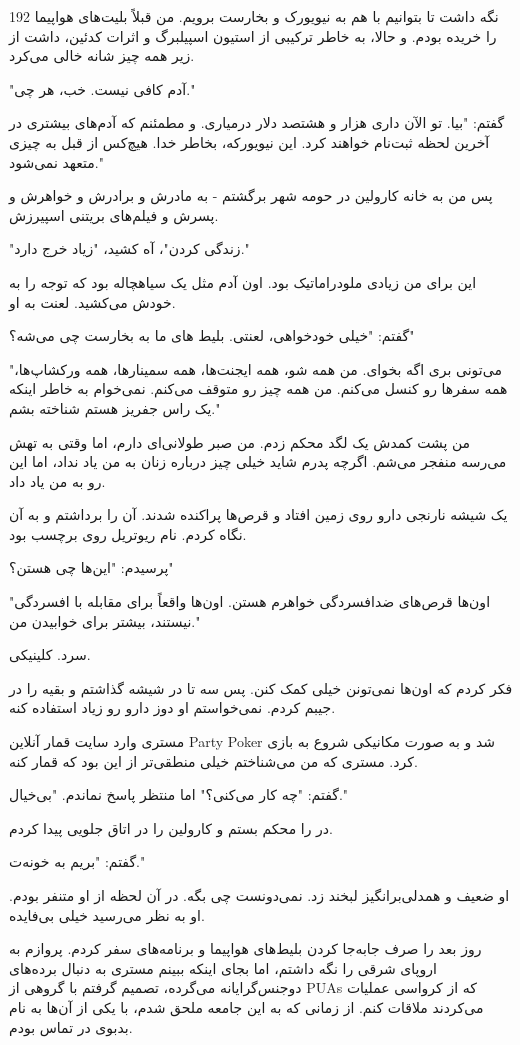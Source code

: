 192
نگه داشت تا بتوانیم با هم به نیویورک و بخارست برویم. من قبلاً بلیت‌های هواپیما را خریده بودم. و حالا، به خاطر ترکیبی از استیون اسپیلبرگ و اثرات کدئین، داشت از زیر همه چیز شانه خالی می‌کرد.

"آدم کافی نیست. خب، هر چی."

گفتم: "بیا. تو الآن داری هزار و هشتصد دلار درمیاری. و مطمئنم که آدم‌های بیشتری در آخرین لحظه ثبت‌نام خواهند کرد. این نیویورکه، بخاطر خدا. هیچ‌کس از قبل به چیزی متعهد نمی‌شود."

پس من به خانه کارولین در حومه شهر برگشتم - به مادرش و برادرش و خواهرش و پسرش و فیلم‌های بریتنی اسپیرزش.

"زندگی کردن"، آه کشید، "زیاد خرج دارد."

این برای من زیادی ملودراماتیک بود. اون آدم مثل یک سیاهچاله بود که توجه را به خودش می‌کشید. لعنت به او.

گفتم: "خیلی خودخواهی، لعنتی. بلیط های ما به بخارست چی می‌شه؟" 

"می‌تونی بری اگه بخوای. من همه شو، همه ایجنت‌ها، همه سمینارها، همه ورکشاپ‌ها، همه سفرها رو کنسل می‌کنم. من همه چیز رو متوقف می‌کنم. نمی‌خوام به خاطر اینکه یک راس جفریز هستم شناخته بشم."

من پشت کمدش یک لگد محکم زدم. من صبر طولانی‌ای دارم، اما وقتی به تهش می‌رسه منفجر می‌شم. اگرچه پدرم شاید خیلی چیز درباره زنان به من یاد نداد، اما این رو به من یاد داد.

یک شیشه نارنجی دارو روی زمین افتاد و قرص‌ها پراکنده شدند. آن را برداشتم و به آن نگاه کردم. نام ریوتریل روی برچسب بود.

پرسیدم: "این‌ها چی هستن؟"

"اون‌ها قرص‌های ضدافسردگی خواهرم هستن. اون‌ها واقعاً برای مقابله با افسردگی نیستند، بیشتر برای خوابیدن من."

سرد. کلینیکی.

فکر کردم که اون‌ها نمی‌تونن خیلی کمک کنن. پس سه تا در شیشه گذاشتم و بقیه را در جیبم کردم. نمی‌خواستم او دوز دارو رو زیاد استفاده کنه.

مستری وارد سایت قمار آنلاین Party Poker شد و به صورت مکانیکی شروع به بازی کرد. مستری که من می‌شناختم خیلی منطقی‌تر از این بود که قمار کنه.

گفتم: "چه کار می‌کنی؟" اما منتظر پاسخ نماندم. "بی‌خیال."

در را محکم بستم و کارولین را در اتاق جلویی پیدا کردم.

گفتم: "بریم به خونه‌ت."

او ضعیف و همدلی‌برانگیز لبخند زد. نمی‌دونست چی بگه. در آن لحظه از او متنفر بودم. او به نظر می‌رسید خیلی بی‌فایده.

روز بعد را صرف جابه‌جا کردن بلیط‌های هواپیما و برنامه‌های سفر کردم. پروازم به اروپای شرقی را نگه داشتم، اما بجای اینکه ببینم مستری به دنبال برده‌های دوجنس‌گرایانه می‌گرده، تصمیم گرفتم با گروهی از PUAs که از کرواسی عملیات می‌کردند ملاقات کنم. از زمانی که به این جامعه ملحق شدم، با یکی از آن‌ها به نام بدبوی در تماس بودم.